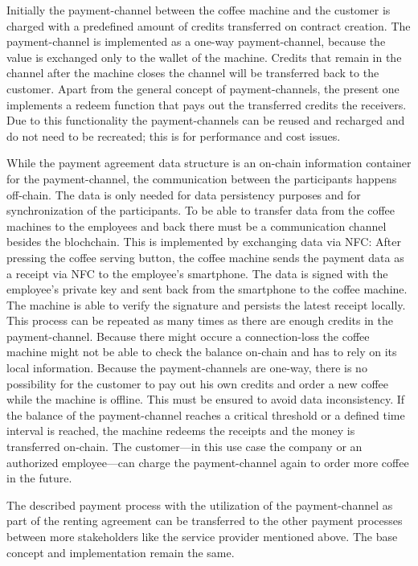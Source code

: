 \documentclass[conference]{IEEEtran}
\begin{document}
Initially the payment-channel between the coffee machine and the customer is charged with a predefined amount of credits transferred on contract creation. The payment-channel is implemented as a one-way payment-channel, because the value is exchanged only to the wallet of the machine. Credits that remain in the channel after the machine closes the channel will be transferred back to the customer. Apart from the general concept of payment-channels, the present one implements a redeem function that pays out the transferred credits the receivers. Due to this functionality the payment-channels can be reused and recharged and do not need to be recreated; this is for performance and cost issues.

While the payment agreement data structure is an on-chain information container for the payment-channel, the communication between the participants happens off-chain. The data is only needed for data persistency purposes and for synchronization of the participants. To be able to transfer data from the coffee machines to the employees and back there must be a communication channel besides the blochchain. This is implemented by exchanging data via NFC: After pressing the coffee serving button, the coffee machine sends the payment data as a receipt via NFC to the employee's smartphone. The data is signed with the employee's private key and sent back from the smartphone to the coffee machine. The machine is able to verify the signature and persists the latest receipt locally. This process can be repeated as many times as there are enough credits in the payment-channel. Because there might occure a connection-loss the coffee machine might not be able to check the balance on-chain and has to rely on its local information. Because the payment-channels are one-way, there is no possibility for the customer to pay out his own credits and order a new coffee while the machine is offline. This must be ensured to avoid data inconsistency. If the balance of the payment-channel reaches a critical threshold or a defined time interval is reached, the machine redeems the receipts and the money is transferred on-chain. The customer---in this use case the company or an authorized employee---can charge the payment-channel again to order more coffee in the future.

The described payment process with the utilization of the payment-channel as part of the renting agreement can be transferred to the other payment processes between more stakeholders like the service provider mentioned above. The base concept and implementation remain the same.
\end{document}
